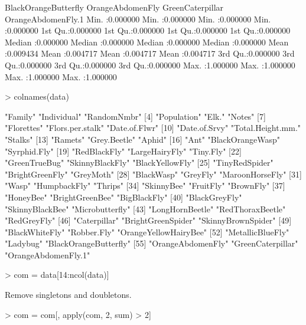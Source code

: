 \documentclass[11pt]{amsart}
\begin{document}
\begin{Schunk}
\begin{Soutput}
 BlackOrangeButterfly OrangeAbdomenFly   GreenCaterpillar   OrangeAbdomenFly.1
 Min.   :0.000000     Min.   :0.000000   Min.   :0.000000   Min.   :0.000000  
 1st Qu.:0.000000     1st Qu.:0.000000   1st Qu.:0.000000   1st Qu.:0.000000  
 Median :0.000000     Median :0.000000   Median :0.000000   Median :0.000000  
 Mean   :0.009434     Mean   :0.004717   Mean   :0.004717   Mean   :0.004717  
 3rd Qu.:0.000000     3rd Qu.:0.000000   3rd Qu.:0.000000   3rd Qu.:0.000000  
 Max.   :1.000000     Max.   :1.000000   Max.   :1.000000   Max.   :1.000000  
\end{Soutput}
\begin{Sinput}
> colnames(data)
\end{Sinput}
\begin{Soutput}
 [1] "Family"               "Individual"           "RandomNmbr"          
 [4] "Population"           "Elk."                 "Notes"               
 [7] "Florettes"            "Flors.per.stalk"      "Date.of.Flwr"        
[10] "Date.of.Srvy"         "Total.Height.mm."     "Stalks"              
[13] "Ramets"               "Grey.Beetle"          "Aphid"               
[16] "Ant"                  "BlackOrangeWasp"      "Syrphid.Fly"         
[19] "RedBlackFly"          "LargeHairyFly"        "Tiny.Fly"            
[22] "GreenTrueBug"         "SkinnyBlackFly"       "BlackYellowFly"      
[25] "TinyRedSpider"        "BrightGreenFly"       "GreyMoth"            
[28] "BlackWasp"            "GreyFly"              "MaroonHorseFly"      
[31] "Wasp"                 "HumpbackFly"          "Thrips"              
[34] "SkinnyBee"            "FruitFly"             "BrownFly"            
[37] "HoneyBee"             "BrightGreenBee"       "BigBlackFly"         
[40] "BlackGreyFly"         "SkinnyBlackBee"       "Microbutterfly"      
[43] "LongHornBeetle"       "RedThoraxBeetle"      "RedGreyFly"          
[46] "Caterpillar"          "BrightGreenSpider"    "SkinnyBrownSpider"   
[49] "BlackWhiteFly"        "Robber.Fly"           "OrangeYellowHairyBee"
[52] "MetallicBlueFly"      "Ladybug"              "BlackOrangeButterfly"
[55] "OrangeAbdomenFly"     "GreenCaterpillar"     "OrangeAbdomenFly.1"  
\end{Soutput}
\begin{Sinput}
> com = data[14:ncol(data)]
\end{Sinput}
\end{Schunk}

\hypertarget{rm.s&d}{Remove singletons and doubletons.}

\begin{Schunk}
\begin{Sinput}
> com = com[, apply(com, 2, sum) > 2]
\end{Sinput}
\end{Schunk}
\end{document}
